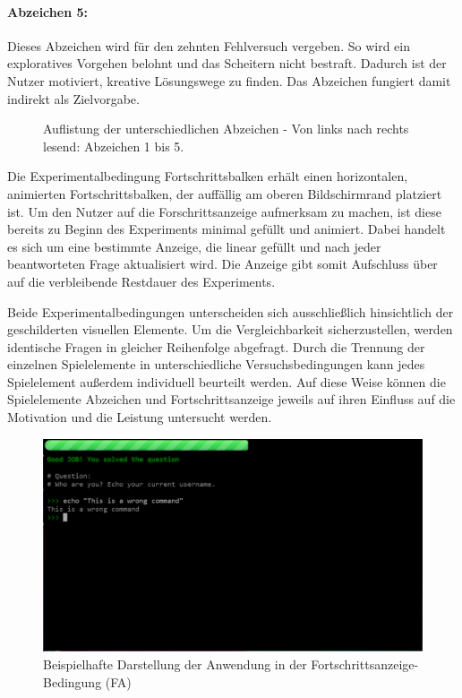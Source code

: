 \paragraph{Abzeichen 5:}
Dieses Abzeichen wird für den zehnten Fehlversuch vergeben. So wird ein exploratives Vorgehen belohnt und das Scheitern nicht bestraft. Dadurch ist der Nutzer motiviert, kreative Lösungswege zu finden. Das Abzeichen fungiert damit indirekt als Zielvorgabe.


\begin{figure}[htbp]
    \centering
    
    
    
    
    
    \caption[Auflistung der unterschiedlichen Abzeichen]{Auflistung der unterschiedlichen Abzeichen - Von links nach rechts lesend: Abzeichen 1 bis 5.}
\end{figure}


Die Experimentalbedingung Fortschrittsbalken erhält einen horizontalen, animierten Fortschrittsbalken, der auffällig am oberen Bildschirmrand platziert ist. Um den Nutzer auf die Forschrittsanzeige aufmerksam zu machen, ist diese bereits zu Beginn des Experiments minimal gefüllt und animiert. Dabei handelt es sich um eine bestimmte Anzeige, die linear gefüllt und nach jeder beantworteten Frage aktualisiert wird. Die Anzeige gibt somit Aufschluss über auf die verbleibende Restdauer des Experiments.

Beide Experimentalbedingungen unterscheiden sich ausschließlich hinsichtlich der geschilderten visuellen Elemente. Um die Vergleichbarkeit sicherzustellen, werden identische Fragen in gleicher Reihenfolge abgefragt. Durch die Trennung der einzelnen Spielelemente in unterschiedliche Versuchsbedingungen kann jedes Spielelement außerdem individuell beurteilt werden. Auf diese Weise können die Spielelemente Abzeichen und Fortschrittsanzeige jeweils auf ihren Einfluss auf die Motivation und die Leistung untersucht werden.

\begin{figure}[htbp]
    \centering
    \includegraphics[width=\textwidth]{img/full_web.png}
    \caption{Beispielhafte Darstellung der Anwendung in der Fortschrittsanzeige-Bedingung (FA)}
\end{figure}


